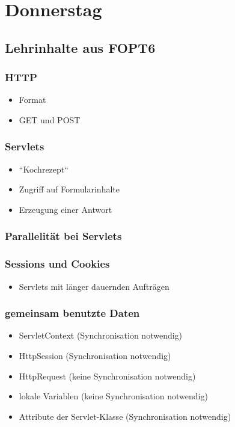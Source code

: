 \section{Donnerstag}

\subsection{Lehrinhalte aus FOPT6}

\subsubsection*{HTTP}
\begin{itemize}
    \item Format
    \item GET und POST
\end{itemize}

\subsubsection*{Servlets}
\begin{itemize}
    \item ``Kochrezept``
    \item Zugriff auf Formularinhalte
    \item Erzeugung einer Antwort
\end{itemize}

\subsubsection*{Parallelität bei Servlets}

\subsubsection*{Sessions und Cookies}
\begin{itemize}
    \item Servlets mit länger dauernden Aufträgen
\end{itemize}

\subsubsection*{gemeinsam benutzte Daten}
\begin{itemize}
    \item ServletContext (Synchronisation notwendig)
    \item HttpSession (Synchronisation notwendig)
    \item HttpRequest (keine Synchronisation notwendig)
    \item lokale Variablen (keine Synchronisation notwendig)
    \item Attribute der Servlet-Klasse (Synchronisation notwendig)
\end{itemize}




